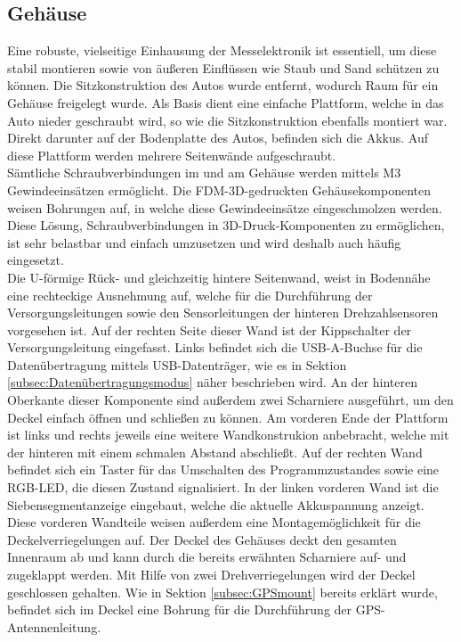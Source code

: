 \subsection{Gehäuse}
\label{subsec:elekCasing}
Eine robuste, vielseitige Einhausung der Messelektronik ist essentiell, um diese stabil montieren sowie von äußeren Einflüssen wie Staub und Sand schützen zu können. Die Sitzkonstruktion des Autos wurde entfernt, wodurch Raum für ein Gehäuse freigelegt wurde. Als Basis dient eine einfache Plattform, welche in das Auto nieder geschraubt wird, so wie die Sitzkonstruktion ebenfalls montiert war. Direkt darunter auf der Bodenplatte des Autos, befinden sich die Akkus. Auf diese Plattform werden mehrere Seitenwände aufgeschraubt.\\
Sämtliche Schraubverbindungen im und am Gehäuse werden mittels M3 Gewindeeinsätzen ermöglicht. Die \ac{FDM}-3D-gedruckten Gehäusekomponenten weisen Bohrungen auf, in welche diese Gewindeeinsätze eingeschmolzen werden. Diese Lösung, Schraubverbindungen in 3D-Druck-Komponenten zu ermöglichen, ist sehr belastbar und einfach umzusetzen und wird deshalb auch häufig eingesetzt. \\
Die U-förmige Rück- und gleichzeitig hintere Seitenwand, weist in Bodennähe eine rechteckige Ausnehmung auf, welche für die Durchführung der Versorgungsleitungen sowie den Sensorleitungen der hinteren Drehzahlsensoren vorgesehen ist. Auf der rechten Seite dieser Wand ist der Kippschalter der Versorgungsleitung eingefasst. Links befindet sich die \ac{USB}-A-Buchse für die Datenübertragung mittels \ac{USB}-Datenträger, wie es in Sektion \ref{subsec:Datenübertragungsmodus} näher beschrieben wird. An der hinteren Oberkante dieser Komponente sind außerdem zwei Scharniere ausgeführt, um den Deckel einfach öffnen und schließen zu können. Am vorderen Ende der Plattform ist links und rechts jeweils eine weitere Wandkonstrukion anbebracht, welche mit der hinteren mit einem schmalen Abstand abschließt. Auf der rechten Wand befindet sich ein Taster für das Umschalten des Programmzustandes sowie eine \ac{RGB}-\ac{LED}, die diesen Zustand signalisiert. In der linken vorderen Wand ist die Siebensegmentanzeige eingebaut, welche die aktuelle Akkuspannung anzeigt. Diese vorderen Wandteile weisen außerdem eine Montagemöglichkeit für die Deckelverriegelungen auf. Der Deckel des Gehäuses deckt den gesamten Innenraum ab und kann durch die bereits erwähnten Scharniere auf- und zugeklappt werden. Mit Hilfe von zwei Drehverriegelungen wird der Deckel geschlossen gehalten. Wie in Sektion \ref{subsec:GPSmount} bereits erklärt wurde, befindet sich im Deckel eine Bohrung für die Durchführung der GPS-Antennenleitung.\\
